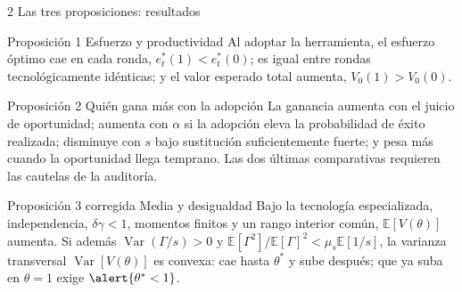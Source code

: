 \documentclass[aspectratio=169,11pt]{beamer}
\begin{document}
\begin{frame}{2 \textperiodcentered{} Las tres proposiciones: resultados}
  \footnotesize
  \begin{block}{Proposición 1 \textperiodcentered{} Esfuerzo y productividad}
    Al adoptar la herramienta, el esfuerzo óptimo cae en cada ronda,
    $e_t^*(1)<e_t^*(0)$; es igual entre rondas tecnológicamente idénticas; y el
    valor esperado total aumenta, $V_0(1)>V_0(0)$.
  \end{block}

  \begin{block}{Proposición 2 \textperiodcentered{} Quién gana más con la adopción}
    La ganancia aumenta con el juicio de oportunidad; aumenta con $\alpha$ si la
    adopción eleva la probabilidad de éxito realizada; disminuye con $s$ bajo
    sustitución suficientemente fuerte; y pesa más cuando la oportunidad llega
    temprano. Las dos últimas comparativas requieren las cautelas de la auditoría.
  \end{block}

  \begin{block}{Proposición 3 corregida \textperiodcentered{} Media y desigualdad}
    Bajo la tecnología especializada, independencia, $\delta\gamma<1$, momentos
    finitos y un rango interior común, $\mathbb E[V(\theta)]$ aumenta. Si además
    $\operatorname{Var}(\Gamma/s)>0$ y
    $\mathbb E[\Gamma^2]/\mathbb E[\Gamma]^2<\mu_s\mathbb E[1/s]$, la varianza
    transversal $\operatorname{Var}[V(\theta)]$ es convexa: cae hasta $\theta^*$
    y sube después; que ya suba en $\theta=1$ exige $\alert{\theta^*<1}$.
  \end{block}
\end{frame}
\end{document}
